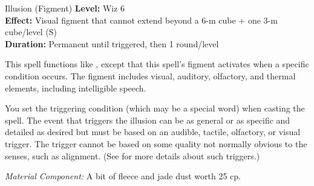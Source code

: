 {Illusion (Figment)}
{
	\textbf{Level:}
	Wiz 6\\
	\textbf{Effect:}
	Visual figment that cannot extend beyond a 6-m cube + one 3-m cube/level (S)\\
	\textbf{Duration:}
	Permanent until triggered, then 1 round/level\\
}
{
	This spell functions like , except that this spell's figment activates when a specific condition occurs. The figment includes visual, auditory, olfactory, and thermal elements, including intelligible speech.

	You set the triggering condition (which may be a special word) when casting the spell. The event that triggers the illusion can be as general or as specific and detailed as desired but must be based on an audible, tactile, olfactory, or visual trigger. The trigger cannot be based on some quality not normally obvious to the senses, such as alignment. (See  for more details about such triggers.)

	\textit{Material Component:}
	A bit of fleece and jade dust worth 25 cp.

}
